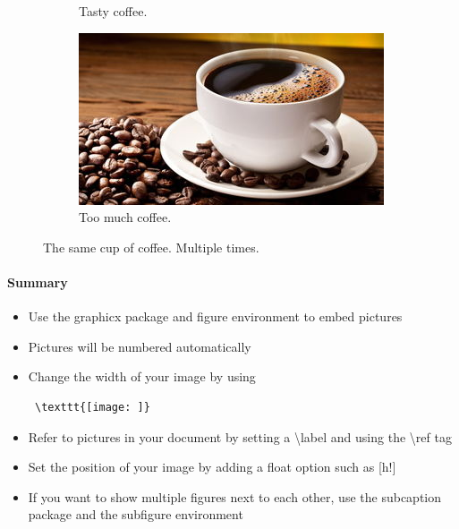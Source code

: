 \begin{figure}[h!]
\begin{subfigure}[b]{0.2\linewidth}
          \caption{Tasty coffee.}
        \end{subfigure}
        \begin{subfigure}[b]{0.5\linewidth}
          \includegraphics[width=\linewidth]{graphics/coffee.jpg}
          \caption{Too much coffee.}
        \end{subfigure}
        \caption{The same cup of coffee. Multiple times.}
        \label{fig:coffee3}
      \end{figure}

    \paragraph{Summary}
      \begin{itemize} %
        \item Use the graphicx package and figure environment to embed pictures
        \item Pictures will be numbered automatically
      \item Change the width of your image by using \begin{verbatim} \texttt{[image: ]} \end{verbatim}
        \item Refer to pictures in your document by setting a \textbackslash label and using the \textbackslash ref tag
        \item Set the position of your image by adding a float option such as [h!]
        \item If you want to show multiple figures next to each other, use the subcaption package and the subfigure environment
      \end{itemize} 

